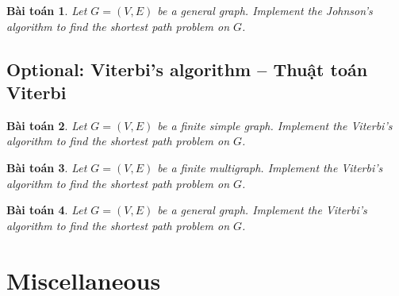 \documentclass{article}
\newtheorem{baitoan}{Bài toán}
\begin{document}
\begin{baitoan}
    Let $G = (V,E)$ be a general graph. Implement the Johnson's algorithm to find the shortest path problem on $G$.
\end{baitoan}


\subsection{Optional: Viterbi's algorithm -- Thuật toán Viterbi}

\begin{baitoan}
    Let $G = (V,E)$ be a finite simple graph. Implement the Viterbi's algorithm to find the shortest path problem on $G$.
\end{baitoan}

\begin{baitoan}
    Let $G = (V,E)$ be a finite multigraph. Implement the Viterbi's algorithm to find the shortest path problem on $G$.
\end{baitoan}

\begin{baitoan}
    Let $G = (V,E)$ be a general graph. Implement the Viterbi's algorithm to find the shortest path problem on $G$.
\end{baitoan}


\section{Miscellaneous}


\printbibliography[heading=bibintoc]
    
\end{document}
